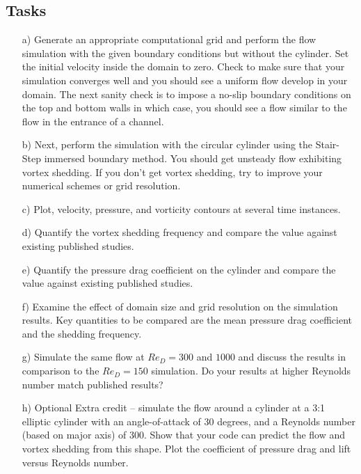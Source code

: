 \documentclass[12pt]{article}
\begin{document}
\subsection*{Tasks}
\begin{enumerate}
    \item[a)] Generate an appropriate computational grid and perform the flow simulation with the given boundary conditions but without the cylinder. Set the initial velocity inside the domain to zero. Check to make sure that your simulation converges well and you should see a uniform flow develop in your domain. The next sanity check is to impose a no-slip boundary conditions on the top and bottom walls in which case, you should see a flow similar to the flow in the entrance of a channel.
    
    \item[b)] Next, perform the simulation with the circular cylinder using the Stair-Step immersed boundary method. You should get unsteady flow exhibiting vortex shedding. If you don't get vortex shedding, try to improve your numerical schemes or grid resolution.
    
    \item[c)] Plot, velocity, pressure, and vorticity contours at several time instances.
    
    \item[d)] Quantify the vortex shedding frequency and compare the value against existing published studies.
    
    \item[e)] Quantify the pressure drag coefficient on the cylinder and compare the value against existing published studies.
    
    \item[f)] Examine the effect of domain size and grid resolution on the simulation results. Key quantities to be compared are the mean pressure drag coefficient and the shedding frequency.
    
    \item[g)] Simulate the same flow at \(Re_D = 300\) and \(1000\) and discuss the results in comparison to the \(Re_D = 150\) simulation. Do your results at higher Reynolds number match published results?
    
    \item[h)] Optional Extra credit – simulate the flow around a cylinder at a 3:1 elliptic cylinder with an angle-of-attack of 30 degrees, and a Reynolds number (based on major axis) of 300. Show that your code can predict the flow and vortex shedding from this shape. Plot the coefficient of pressure drag and lift versus Reynolds number.
\end{enumerate}
\end{document}
